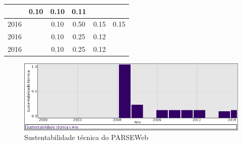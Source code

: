 \begin{table}[H]
\begin{tabular}{| l | c | c | c | c | c |}
          &
          0.10
          &
          0.10
          &
          0.11
          &
          \\
\hline
            2016
          &
          
          &
          0.10
          &
          0.50
          &
          0.15
          &
            {\color{red} 0.15}
          \\
            2016
          &
          
          &
          0.10
          &
          0.25
          &
          0.12
          &
          \\
            2016
          &
          
          &
          0.10
          &
          0.25
          &
          0.12
          &
          \\
\hline
\end{tabular}
\end{table}

\begin{figure}[h]
  \center
  \includegraphics[scale=0.50]{result-documents/charts/parseweb.png}
  \caption{Sustentabilidade técnica do PARSEWeb}
\end{figure}


